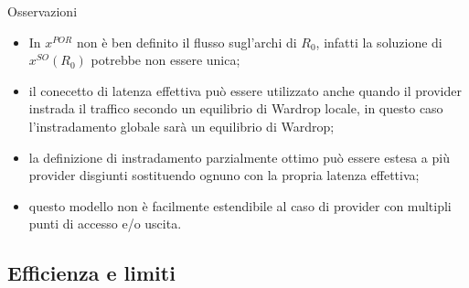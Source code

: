 \documentclass{beamer}
\theoremstyle{plain}
\theoremstyle{definition}
\theoremstyle{remark}
\begin{document}
\begin{frame}{Osservazioni}
  \begin{itemize}
  \item In $x^{POR}$ non è ben definito il flusso sugl'archi di $R_0$,
    infatti la soluzione di $x^{SO}(R_0)$ potrebbe non essere unica;
  \item il conecetto di latenza effettiva può essere utilizzato anche
    quando il provider instrada il traffico secondo un equilibrio di
    Wardrop locale, in questo caso l'instradamento globale sarà un
    equilibrio di Wardrop;
  \item la definizione di instradamento parzialmente ottimo può essere
    estesa a più provider disgiunti sostituendo ognuno con la propria
    latenza effettiva;
  \item questo modello non è facilmente estendibile al caso di
    provider con multipli punti di accesso e/o uscita.
  \end{itemize}
\end{frame}

\subsection{Efficienza e limiti}
\end{document}
